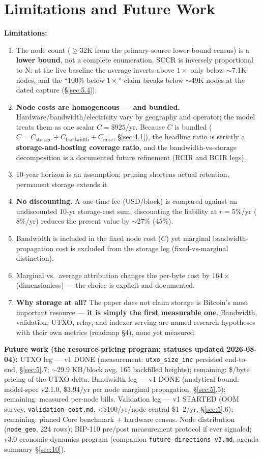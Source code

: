 \documentclass[11pt]{article}
\begin{document}
\section{Limitations and Future Work}\label{sec:7}
\textbf{Limitations:}
\begin{enumerate}[nosep]
  \item The node count ($\geq$32K from the primary-source lower-bound census) is a \textbf{lower bound}, not a complete enumeration. SCCR is inversely proportional to N: at the live baseline the average inverts above $1\times$ only below $\sim$7.1K nodes, and the ``100\% below $1\times$'' claim breaks below $\sim$49K nodes at the dated capture (\S\ref{sec:5.4}).
  \item \textbf{Node costs are homogeneous --- and bundled.} Hardware/bandwidth/electricity vary by geography and operator; the model treats them as one scalar $C = \$925$/yr. Because $C$ is bundled ($C = C_{\mathrm{storage}} + C_{\mathrm{bandwidth}} + C_{\mathrm{misc}}$, \S\ref{sec:4.1}), the headline ratio is strictly a \textbf{storage-and-hosting coverage ratio}, and the bandwidth-vs-storage decomposition is a documented future refinement (RCIR and BCIR legs).
  \item 10-year horizon is an assumption; pruning shortens actual retention, permanent storage extends it.
  \item \textbf{No discounting.} A one-time fee (USD/block) is compared against an undiscounted 10-yr storage-cost sum; discounting the liability at $r=5\%$/yr ($8\%$/yr) reduces the present value by $\sim$27\% (45\%).
  \item Bandwidth is included in the fixed node cost ($C$) yet marginal bandwidth-propagation cost is excluded from the storage leg (fixed-vs-marginal distinction).
  \item Marginal vs.\ average attribution changes the per-byte cost by $164\times$ (dimensionless) --- the choice is explicit and documented.
  \item \textbf{Why storage at all?} The paper does not claim storage is Bitcoin's most important resource --- \textbf{it is simply the first measurable one}. Bandwidth, validation, UTXO, relay, and indexer serving are named research hypotheses with their own metrics (roadmap \S4), none yet measured.
\end{enumerate}
\textbf{Future work (the resource-pricing program; statuses updated 2026-08-04):} UTXO leg --- v1 DONE (measurement: \texttt{utxo\_size\_inc} persisted end-to-end, \S\ref{sec:5}.7; $\sim$29.9 KB/block avg, 165 backfilled heights); remaining: \$/byte pricing of the UTXO delta. Bandwidth leg --- v1 DONE (analytical bound: model-spec v2.1.0, \$3.94/yr per node marginal propagation, \S\ref{sec:5}.5); remaining: measured per-node bills. Validation leg --- v1 STARTED (OOM survey, \texttt{validation-cost.md}, <\$100/yr/node central \$1--2/yr, \S\ref{sec:5}.6); remaining: pinned Core benchmark + hardware census. Node distribution (\texttt{node\_geo}, 224 rows); BIP-110 pre/post measurement protocol if ever signaled; v3.0 economic-dynamics program (companion \texttt{future-directions-v3.md}, agenda summary \S\ref{sec:10}).
\end{document}
